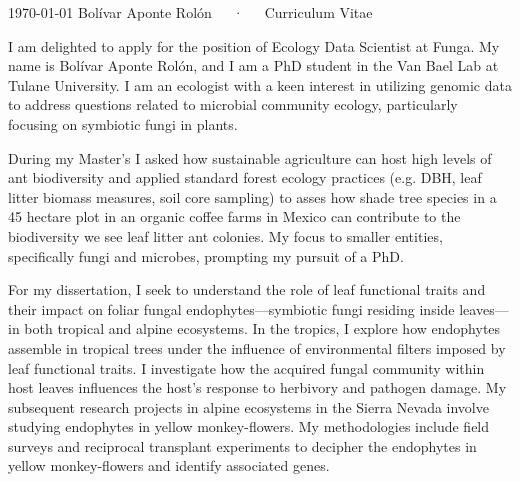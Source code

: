 \documentclass[11pt, letterpaper]{awesome-cv}
\begin{document}
\makecvheader[R]

\makecvfooter
  {\today}
    {Bolívar Aponte Rolón~~~·~~~Curriculum Vitae}{}

\makelettertitle

\begin{cvletter}
\indent I am delighted to apply for the position of Ecology Data Scientist at Funga.  My name is Bolívar Aponte Rolón, and I am a PhD student in the Van Bael Lab at Tulane University. I am an ecologist with a keen interest in utilizing genomic data to address questions related to microbial community ecology, particularly focusing on symbiotic fungi in plants.

\indent During my Master's I asked how sustainable agriculture can host high levels of ant biodiversity and applied standard forest ecology practices (e.g. DBH, leaf litter biomass measures, soil core sampling) to asses how shade tree species in a 45 hectare plot in an organic coffee farms in Mexico can contribute to the biodiversity we see leaf litter ant colonies. My focus to smaller entities, specifically fungi and microbes, prompting my pursuit of a PhD.

\indent For my dissertation, I seek to understand the role of leaf functional traits and their impact on foliar fungal endophytes—symbiotic fungi residing inside leaves—in both tropical and alpine ecosystems. In the tropics, I explore how endophytes assemble in tropical trees under the influence of environmental filters imposed by leaf functional traits. I investigate how the acquired fungal community within host leaves influences the host's response to herbivory and pathogen damage. My subsequent research projects in alpine ecosystems in the Sierra Nevada involve studying endophytes in yellow monkey-flowers. My methodologies include field surveys and reciprocal transplant experiments to decipher the endophytes in yellow monkey-flowers and identify associated genes.


\end{cvletter}
\end{document}

